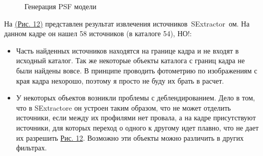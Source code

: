 \documentclass[12pt,a4paper]{article}
\begin{document}
\begin{figure}[h]
\begin{minipage}{0.45\textwidth}
    \end{minipage}
    \caption{ Генерация PSF модели} \label{pic11}
\end{figure}

\newpage
На \hyperref[pic12]{(Рис. 12)} представлен результат извлечения источников~SExtractor~ом. На данном кадре он нашел 58 источников (в каталоге 54), НО!:
    \begin{itemize}
        \item Часть найденных источников находятся на границе кадра и не входят в исходный каталог. Так же некоторые объекты каталога с границ кадра не были найдены вовсе. В принципе проводить фотометрию по изображениям с края кадра нехорошо, поэтому я просто не буду их брать в расчет.
        \item У некоторых объектов возникли проблемы с деблендированием. Дело в том, что в SExtractore он устроен таким образом, что не может отделить источники, если между их профилями нет провала, а на кадре присутствуют источники, для которых переход о одного к другому идет плавно, что не дает их разрешить \hyperref[pic12]{Рис. 12}. Возможно эти объекты можно различить в других фильтрах.
    \end{itemize}
\end{document}
